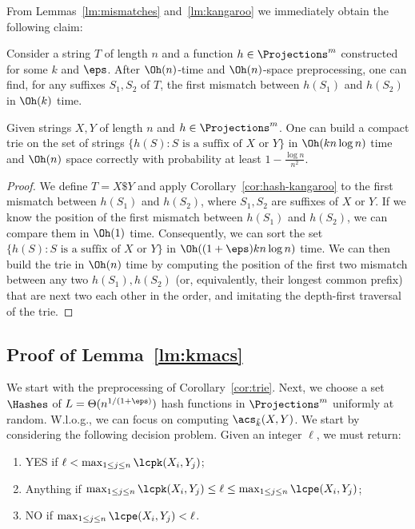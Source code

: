 From Lemmas~\ref{lm:mismatches} and~\ref{lm:kangaroo} we immediately obtain the following claim:

\begin{corollary}
\label{cor:hash-kangaroo}
Consider a string $T$ of length $n$ and a function $h \in \Projections^m$ constructed for some $k$ and $\eps$. After $\Oh(n)$-time and $\Oh(n)$-space preprocessing, one can find, for any suffixes $S_1, S_2$ of $T$, the first mismatch between $h(S_1)$ and $h(S_2)$ in $\Oh(k)$ time.
\end{corollary}

\begin{corollary}
\label{cor:trie}
Given strings $X, Y$ of length $n$ and $h \in \Projections^m$. One can build a compact trie on the set of strings $\{h(S) : S \mbox{ is a suffix of } X \mbox{ or } Y\}$ in $\Oh(k n \log n)$ time and $\Oh(n)$ space correctly with probability at least $1-\frac{\log n}{n^2}$. 
\end{corollary}
\begin{proof}
We define $T = X \$ Y$ and apply Corollary~\ref{cor:hash-kangaroo} to the first mismatch between $h(S_1)$ and $h(S_2)$, where $S_1, S_2$ are suffixes of $X$ or $Y$. If we know the position of the first mismatch between $h(S_1)$ and $h(S_2)$, we can compare them in $\Oh(1)$ time. Consequently, we can sort the set $\{h(S) : S \mbox{ is a suffix of } X \mbox{ or } Y\}$ in $\Oh((1+\eps) k n \log n)$ time. We can then build the trie in $\Oh(n)$ time by computing the position of the first two mismatch between any two $h(S_1), h(S_2)$ (or, equivalently, their longest common prefix) that are next two each other in the order, and imitating the depth-first traversal of the trie.
\end{proof}

\subsection{Proof of Lemma~\ref{lm:kmacs}}
We start with the preprocessing of Corollary~\ref{cor:trie}. Next, we choose a set $\Hashes$ of $L = \Theta(n^{1/(1+\eps)})$ hash functions in $\Projections^m$ uniformly at random. W.l.o.g., we can focus on computing $\acs_{\tilde{k}} (X, Y)$. We start by considering the following decision problem. Given an integer $\ell$, we must return:
\begin{enumerate}
\item YES if $\ell < \max_{1 \le j \le n} \lcpk(X_i, Y_j)$;
\item Anything if $\max_{1 \le j \le n} \lcpk(X_i, Y_j) \le \ell \le \max_{1 \le j \le n} \lcpe(X_i, Y_j)$; 
\item NO if $\max_{1 \le j \le n} \lcpe(X_i, Y_j) < \ell$.
\end{enumerate}

